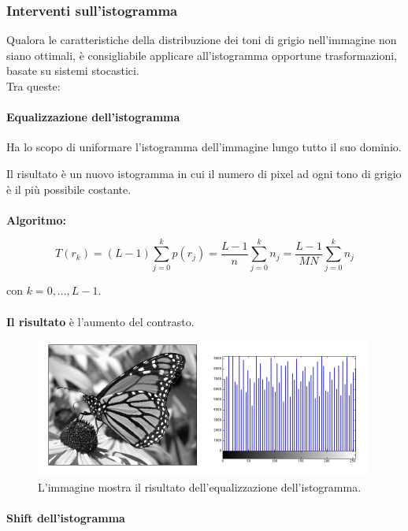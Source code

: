 \subsubsection{Interventi sull'istogramma}

Qualora le caratteristiche della distribuzione dei toni di grigio nell'immagine non siano ottimali, è consigliabile applicare
all'istogramma opportune trasformazioni, basate su sistemi stocastici.
\\Tra queste:

\paragraph{Equalizzazione dell'istogramma}

\begin{definition}
    Ha lo scopo di uniformare l'istogramma dell'immagine lungo tutto
    il suo dominio.
\end{definition}
Il risultato è un nuovo istogramma in cui il numero di pixel ad ogni
tono di grigio è il più possibile costante. \\\\
\textbf{Algoritmo:}

$$
    T(r_k) = (L-1)\sum_{j=0}^{k}p(r_j)=\frac{L-1}{n} \sum_{j=0}^{k}n_j = \frac{L-1}{MN}\sum_{j=0}^{k}n_j
$$

con $k=0,...,L-1$.
\\\\
\textbf{Il risultato} è l'aumento del contrasto.

\begin{figure}[H]
    \centering
    \includegraphics[width=\linewidth, keepaspectratio]{capitoli/immagini/imgs/eq-istogramma.png}
    \caption{L'immagine mostra il risultato dell'equalizzazione dell'istogramma.}
\end{figure}
\paragraph{Shift dell'istogramma}

